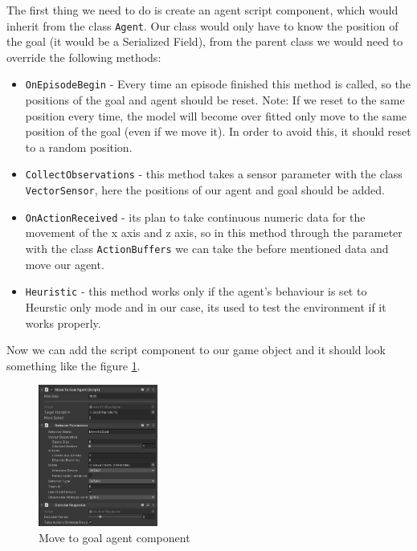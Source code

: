 \documentclass[a4paper, 12pt]{book}
\begin{document}
The first thing we need to do is create an agent script component, which would inherit from the class \texttt{Agent}. Our class would only have to know the position of the goal (it would be a Serialized Field), from the parent class we would need to override the following methods:
\begin{itemize}
    \item \texttt{OnEpisodeBegin} - Every time an episode finished this method is called, so the positions of the goal and agent should be reset. Note: If we reset to the same position every time, the model will become over fitted only move to the same position of the goal (even if we move it). In order to avoid this, it should reset to a random position.
    \item \texttt{CollectObservations} - this method takes a sensor parameter with the class \texttt{VectorSensor}, here the positions of our agent and goal should be added.
    \item \texttt{OnActionReceived} - its plan to take continuous numeric data for the movement of the x axis and z axis, so in this method through the parameter with the class \texttt{ActionBuffers} we can take the before mentioned data and move our agent.
    \item \texttt{Heuristic} - this method works only if the agent's behaviour is set to Heurstic only mode and in our case, its used to test the environment if it works properly.
\end{itemize}

Now we can add the script component to our game object and it should look something like the figure \ref{pic9}.
\begin{figure}[h]
\begin{center}
\includegraphics[width=0.35\textwidth]{Images/movetogoalcomponent.png}
\end{center}
\caption{Move to goal agent component}
\label{pic9}
\end{figure}
\end{document}
